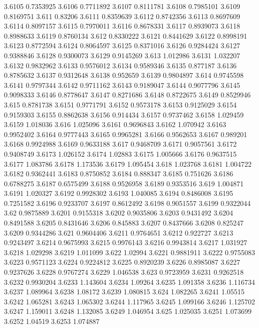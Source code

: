 3.6105  0.7353925
3.6106  0.7711892
3.6107  0.8111781
3.6108  0.7985101
3.6109  0.8169751
3.611  0.83206
3.6111  0.8359639
3.6112  0.8742356
3.6113  0.8697609
3.6114  0.8097157
3.6115  0.7970011
3.6116  0.8678331
3.6117  0.8939073
3.6118  0.8988633
3.6119  0.8760134
3.612  0.8330222
3.6121  0.8441629
3.6122  0.8998191
3.6123  0.8772594
3.6124  0.8064597
3.6125  0.8371016
3.6126  0.9284424
3.6127  0.9388846
3.6128  0.9300073
3.6129  0.9145269
3.613  1.012986
3.6131  1.032207
3.6132  0.9832962
3.6133  0.9576012
3.6134  0.9589346
3.6135  0.877187
3.6136  0.8785632
3.6137  0.9312648
3.6138  0.952659
3.6139  0.9804897
3.614  0.9745598
3.6141  0.9797344
3.6142  0.9711162
3.6143  0.9189047
3.6144  0.9077796
3.6145  0.9098333
3.6146  0.8778647
3.6147  0.8271686
3.6148  0.8722675
3.6149  0.8529946
3.615  0.8781738
3.6151  0.9771791
3.6152  0.9573178
3.6153  0.9125029
3.6154  0.9159303
3.6155  0.8862638
3.6156  0.914434
3.6157  0.9737462
3.6158  1.029459
3.6159  1.018036
3.616  1.025096
3.6161  0.9696843
3.6162  1.070942
3.6163  0.9952402
3.6164  0.9777443
3.6165  0.9965281
3.6166  0.9562653
3.6167  0.989201
3.6168  0.9924988
3.6169  0.9633188
3.617  0.9468709
3.6171  0.9057561
3.6172  0.9408749
3.6173  1.026152
3.6174  1.02883
3.6175  1.005666
3.6176  0.9637515
3.6177  1.083786
3.6178  1.173536
3.6179  1.095454
3.618  1.023768
3.6181  1.004722
3.6182  0.9362441
3.6183  0.8750852
3.6184  0.888347
3.6185  0.751626
3.6186  0.6788275
3.6187  0.6575499
3.6188  0.9526958
3.6189  0.9353516
3.619  1.004871
3.6191  1.020327
3.6192  0.9928302
3.6193  1.040085
3.6194  0.8486008
3.6195  0.7251582
3.6196  0.9233707
3.6197  0.8612492
3.6198  0.9051557
3.6199  0.9322044
3.62  0.9875889
3.6201  0.9155318
3.6202  0.9035806
3.6203  0.9431492
3.6204  0.8491588
3.6205  0.8431646
3.6206  0.845883
3.6207  0.8437666
3.6208  0.825247
3.6209  0.9344286
3.621  0.9604406
3.6211  0.9764651
3.6212  0.922727
3.6213  0.9243497
3.6214  0.9675993
3.6215  0.9976143
3.6216  0.9943814
3.6217  1.031927
3.6218  1.029298
3.6219  1.011099
3.622  1.02994
3.6221  0.9881911
3.6222  0.9755083
3.6223  0.9571123
3.6224  0.9224812
3.6225  0.8920239
3.6226  0.8985087
3.6227  0.9237626
3.6228  0.9767274
3.6229  1.046538
3.623  0.9723959
3.6231  0.9262518
3.6232  0.9930204
3.6233  1.143604
3.6234  1.09264
3.6235  1.091358
3.6236  1.116734
3.6237  1.089964
3.6238  1.08172
3.6239  1.080815
3.624  1.082265
3.6241  1.05515
3.6242  1.065281
3.6243  1.065302
3.6244  1.117965
3.6245  1.099166
3.6246  1.125702
3.6247  1.159011
3.6248  1.132085
3.6249  1.046954
3.625  1.025035
3.6251  1.073699
3.6252  1.04519
3.6253  1.074887
